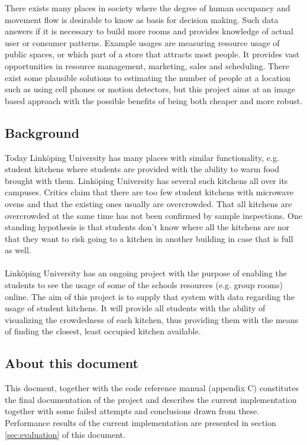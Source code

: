 There exists many places in society where the degree of human occupancy and movement flow is desirable to know as basis for decision making. Such data answers if it is necessary to build more rooms and provides knowledge of actual user or consumer patterns. Example usages are measuring resource usage of public spaces, or which part of a store that attracts most people. It provides vast opportunities in resource management, marketing, sales and scheduling. There exist some plausible solutions to estimating the number of people at a location such as using cell phones or motion detectors, but this project aims at an image based approach with the possible benefits of being both cheaper and more robust.

\subsection{Background}
Today Linköping University has many places with similar functionality, e.g. student kitchens where students are provided with the ability to warm food brought with them. Linköping University has several such kitchens all over its campuses. Critics claim that there are too few student kitchens with microwave ovens and that the existing ones usually are overcrowded. That all kitchens are overcrowded at the same time has not been confirmed by sample inspections. One standing hypothesis is that students don't know where all the kitchens are nor that they want to risk going to a kitchen in another building in case that is full as well.\\
\\
Linköping University has an ongoing project with the purpose of enabling the students to see the usage of some of the schools resources (e.g. group rooms) online. The aim of this project is to supply that system with data regarding the usage of student kitchens. It will provide all students with the ability of visualizing the crowdedness of each kitchen, thus providing them with the means of finding the closest, least occupied kitchen available.

\subsection{About this document}
This docment, together with the code reference manual (appendix C) constitutes the final documentation of the project and describes the current implementation together with some failed attempts and conclusions drawn from these. Performance results of the current implementation are presented in section \ref{sec:evaluation} of this document.

